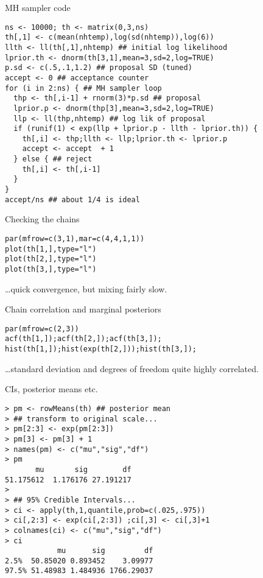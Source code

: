 \documentclass{beamer}
\newcommand{\eps}[3]
{{\begin{center}
 \rotatebox{#1}{\scalebox{#2}{\texttt{[image: \#3]}}}
 \end{center}}
}
\begin{document}
\begin{frame}[fragile]{MH sampler code}

{\scriptsize \begin{verbatim}
ns <- 10000; th <- matrix(0,3,ns)
th[,1] <- c(mean(nhtemp),log(sd(nhtemp)),log(6))
llth <- ll(th[,1],nhtemp) ## initial log likelihood
lprior.th <- dnorm(th[3,1],mean=3,sd=2,log=TRUE)
p.sd <- c(.5,.1,1.2) ## proposal SD (tuned)
accept <- 0 ## acceptance counter
for (i in 2:ns) { ## MH sampler loop
  thp <- th[,i-1] + rnorm(3)*p.sd ## proposal
  lprior.p <- dnorm(thp[3],mean=3,sd=2,log=TRUE) 
  llp <- ll(thp,nhtemp) ## log lik of proposal
  if (runif(1) < exp(llp + lprior.p - llth - lprior.th)) {
    th[,i] <- thp;llth <- llp;lprior.th <- lprior.p
    accept <- accept  + 1
  } else { ## reject
    th[,i] <- th[,i-1]
  }
}
accept/ns ## about 1/4 is ideal
\end{verbatim}
}
\end{frame}

\begin{frame}[fragile]{Checking the chains}

{\scriptsize \begin{verbatim}
par(mfrow=c(3,1),mar=c(4,4,1,1))
plot(th[1,],type="l")
plot(th[2,],type="l")
plot(th[3,],type="l")
\end{verbatim}}

\eps{-90}{.3}{chains.eps}

\ldots quick convergence, but mixing fairly slow.

\end{frame}


\begin{frame}[fragile]{Chain correlation and marginal posteriors}

{\scriptsize \begin{verbatim}
par(mfrow=c(2,3))
acf(th[1,]);acf(th[2,]);acf(th[3,]);
hist(th[1,]);hist(exp(th[2,]));hist(th[3,]);
\end{verbatim}}

\eps{-90}{.3}{acf-hist.eps}

\ldots standard deviation and degrees of freedom quite highly correlated.

\end{frame}

\begin{frame}[fragile]{CIs, posterior means etc.}

{\scriptsize \begin{verbatim}
> pm <- rowMeans(th) ## posterior mean
> ## transform to original scale...
> pm[2:3] <- exp(pm[2:3])
> pm[3] <- pm[3] + 1
> names(pm) <- c("mu","sig","df")
> pm
       mu       sig        df 
51.175612  1.176176 27.191217 
> 
> ## 95% Credible Intervals...
> ci <- apply(th,1,quantile,prob=c(.025,.975))
> ci[,2:3] <- exp(ci[,2:3]) ;ci[,3] <- ci[,3]+1
> colnames(ci) <- c("mu","sig","df")
> ci
            mu      sig         df
2.5%  50.85020 0.893452    3.09977
97.5% 51.48983 1.484936 1766.29037
\end{verbatim}}

\end{frame}
\end{document}
